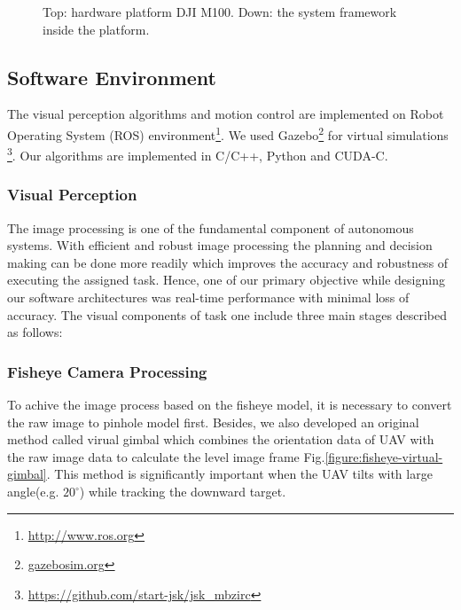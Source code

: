 \documentclass{standalone}
\begin{document}
\begin{figure}[h]
\begin{center}
\begin{minipage}{1.0\hsize}
\begin{center}
          \end{center}
        \end{minipage}
    \end{center}
    \caption{Top: hardware platform DJI M100. Down: the system framework inside the platform.}
    \label{figure:task1-platform}
\end{figure}


\subsection{Software Environment}
The visual perception algorithms and motion control are implemented
on Robot Operating System (ROS) environment\footnote{\url{http://www.ros.org}}.
We used Gazebo\footnote{\url{gazebosim.org}} for virtual simulations
\footnote{\url{https://github.com/start-jsk/jsk_mbzirc}}. Our
algorithms are implemented in C/C++, Python and CUDA-C.


\subsubsection{Visual Perception}

The image processing is one of the fundamental component of autonomous
systems. With efficient and robust image processing the planning and
decision making can be done more readily which improves the accuracy
and robustness of executing the assigned task. Hence, one of our
primary objective while designing our software architectures was
real-time performance with minimal loss of accuracy. The visual
components of task one include three main stages described as follows:

\subsubsection{Fisheye Camera Processing}
To achive the image process based on the fisheye model, it is necessary to convert the raw image to pinhole model first. Besides, we also developed an original method called virual gimbal which combines the orientation data of UAV with the raw image data to calculate the level image frame Fig.\ref{figure:fisheye-virtual-gimbal}. This method is significantly important when the UAV tilts with large angle(e.g. $20^\circ$) while tracking the downward target.
\end{document}
